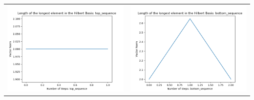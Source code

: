 \documentclass[10pt]{article}
\begin{document}
\begin{tabular}{c|c}
\begin{minipage}{.45\textwidth}
\includegraphics[width=\textwidth]{"DATA/5d/6 generators 1 bound F/top_sequence LENGTH"}
\end{minipage} &
\begin{minipage}{.45\textwidth}
\includegraphics[width=\textwidth]{"DATA/5d/6 generators 1 bound F bottomup/bottom_sequence LENGTH"}
\end{minipage}
\end{tabular}
\end{document}
